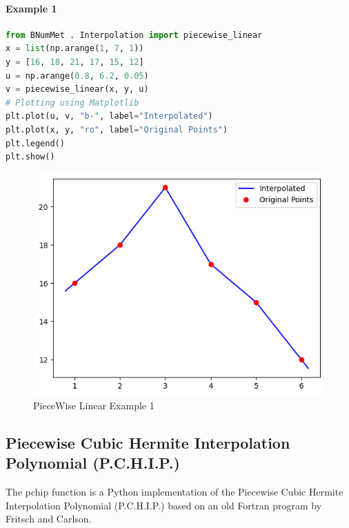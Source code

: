 \paragraph{Example 1}{
\begin{lstlisting}[language=Python]
from BNumMet . Interpolation import piecewise_linear
x = list(np.arange(1, 7, 1))
y = [16, 18, 21, 17, 15, 12]
u = np.arange(0.8, 6.2, 0.05)
v = piecewise_linear(x, y, u)
# Plotting using Matplotlib
plt.plot(u, v, "b-", label="Interpolated")
plt.plot(x, y, "ro", label="Original Points")
plt.legend()
plt.show()
\end{lstlisting}
\begin{figure}[H]
    \centering
    \includegraphics{Include/Images/Thesis/Documentation/Interpolation/PieceWise Linear Example 1.png}
    \caption{PieceWise Linear Example 1}
    \label{fig:PieceWise Linear Example 1}
\end{figure}
}

\subsection{Piecewise Cubic Hermite Interpolation Polynomial (P.C.H.I.P.)}
The pchip function is a Python implementation of the Piecewise Cubic Hermite Interpolation Polynomial (P.C.H.I.P.) based on an old Fortran program by Fritsch and Carlson.

